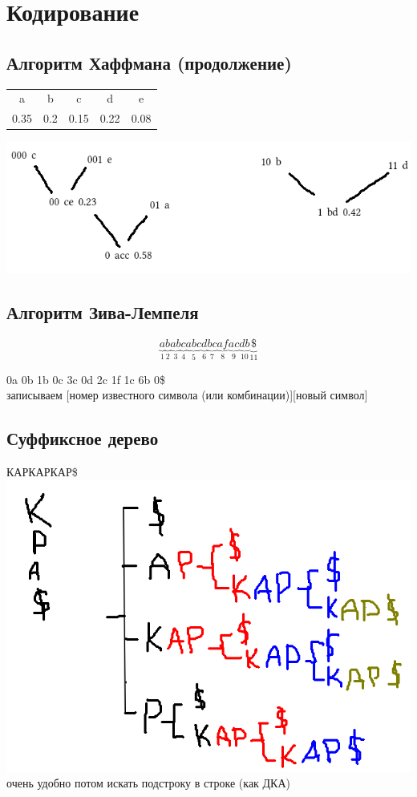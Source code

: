\chapter{Кодирование}

\section{Алгоритм Хаффмана (продолжение)}

\begin{tabular}{c c c c c}
 a & b & c & d & e \\
 0.35 & 0.2 & 0.15 & 0.22 & 0.08
\end{tabular}

\includegraphics[scale=0.6]{1}


\section{Алгоритм Зива-Лемпеля}

$$\underbrace{a}_1\underbrace{b}_2\underbrace{ab}_3\underbrace{c}_4\underbrace{abc}_5\underbrace{d}_6\underbrace{bc}_7\underbrace{af}_8\underbrace{ac}_9\underbrace{db}_{10}\underbrace{\$}_{11}$$

0a 0b 1b 0c 3c 0d 2c 1f 1c 6b 0\$ \\
записываем [номер известного символа (или комбинации)][новый символ]


\section{Суффиксное дерево }

КАРКАРКАР\$ \\
\includegraphics[scale=0.4]{2} \\
очень удобно потом искать подстроку в строке (как ДКА)

